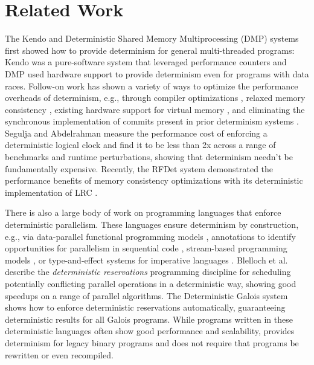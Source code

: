 \section{Related Work}
\label{s:related}

The Kendo \cite{olszewski_kendo:_2009} and Deterministic Shared Memory Multiprocessing (DMP) \cite{devietti_dmp:_2009} systems first showed how to provide determinism for general multi-threaded programs: Kendo was a pure-software system that leveraged performance counters and DMP used hardware support to provide determinism even for programs with data races. Follow-on work has shown a variety of ways to optimize the performance overheads of determinism, e.g., through compiler optimizations \cite{bergan_coredet:_2010}, relaxed memory consistency \cite{derek_r._hower_calvin:_2011,devietti_rcdc:_2011,amittai_aviram_workspace_2011,derek_r._hower_hobbes:_2011}, existing hardware support for virtual memory \cite{berger_grace:_2009,amittai_aviram_efficient_2010,tom_bergan_deterministic_2010,liu_dthreads:_2011}, and eliminating the synchronous implementation of commits present in prior determinism systems \cite{merrifield_conversion:_2013}. Segulja and Abdelrahman \cite{Segulja:2014:pact:cost-weak-det} measure the performance cost of enforcing a deterministic logical clock and find it to be less than 2x across a range of benchmarks and runtime perturbations, showing that determinism needn't be fundamentally expensive. Recently, the RFDet system \cite{kai_lu_efficient_2014} demonstrated the performance benefits of memory consistency optimizations with its deterministic implementation of LRC \cite{keleher_treadmarks:_1994}.


There is also a large body of work on programming languages that enforce deterministic parallelism. These languages ensure determinism by construction, e.g., via data-parallel functional programming models \cite{guy_blelloch_nesl:_1992}, annotations to identify opportunities for parallelism in sequential code \cite{rinard_design_1998}, stream-based programming models \cite{william_thies_streamit:_2002}, or type-and-effect systems for imperative languages \cite{bocchino_type_2009}. Blelloch et al. \cite{shun_brief_2012} describe the \emph{deterministic reservations} programming discipline for scheduling potentially conflicting parallel operations in a deterministic way, showing good speedups on a range of parallel algorithms. The Deterministic Galois system \cite{nguyen_deterministic_2014} shows how to enforce deterministic reservations automatically, guaranteeing deterministic results for all Galois programs. While programs written in these deterministic languages often show good performance and scalability, \lib provides determinism for legacy binary programs and does not require that programs be rewritten or even recompiled.

